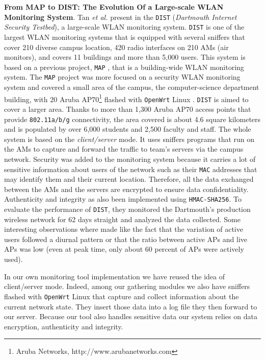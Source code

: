 \textbf{From MAP to DIST: The Evolution Of a Large-scale WLAN Monitoring System}. Tan \textit{et al.} present in \citep{article3} the \texttt{DIST} (\textit{Dartmouth Internet Security Testbed}), a large-scale WLAN monitoring system. \texttt{DIST} is one of the largest WLAN monitoring systems that is equipped with several sniffers that cover 210 diverse campus location, 420 radio interfaces on 210 AMs (air monitors), and covers 11 buildings and more than 5,000 users. This system is based on a previous project, \texttt{MAP} \cite{MAP}, that is a building-wide WLAN monitoring system. The \texttt{MAP} project was more focused on a security WLAN monitoring system and covered a small area of the campus, the computer-science department building, with 20 Aruba AP70\footnote{Aruba Networks, http://www.arubanetworks.com} flashed with \texttt{OpenWrt} Linux \cite{openwrt}. \texttt{DIST} is aimed to cover a larger area. Thanks to more than 1,300 Aruba AP70 access points that provide \texttt{802.11a/b/g} connectivity, the area covered is about 4.6 square kilometers and is populated by over 6,000 students and 2,500 faculty and staff. The whole system is based on the \textit{client/server} mode. It uses sniffers programs that run on the AMs to capture and forward the traffic to team's servers via the campus network. Security was added to the monitoring system because it carries a lot of sensitive information about users of the network such as their \texttt{MAC} addresses that may identify them and their current location. Therefore, all the data exchanged between the AMs and the servers are encrypted to ensure data confidentiality. Authenticity and integrity as also been implemented using \texttt{HMAC-SHA256}. To evaluate the performance of \texttt{DIST}, they monitored the Dartmouth's production wireless network for 62 days straight and analyzed the data collected. Some interesting observations where made like the fact that the variation of active users followed a diurnal pattern or that the ratio between active APs and live APs was low (even at peak time, only about 60 percent of APs were actively used).

 In our own monitoring tool implementation we have reused the idea of client/server mode. Indeed, among our gathering modules we also have sniffers flashed with \texttt{OpenWrt} Linux that capture and collect information about the current network state. They insert those data into a log file they then forward to our server. Because our tool also handles sensitive data our system relies on data encryption, authenticity and integrity.


